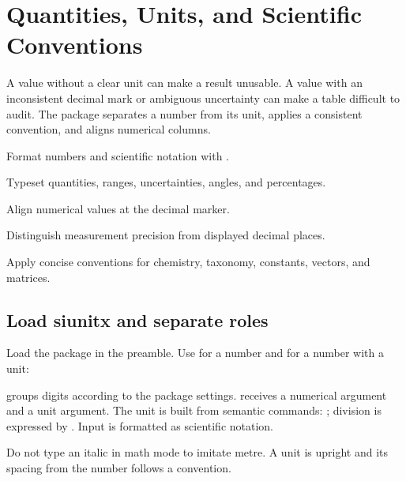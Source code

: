 \chapter{Quantities, Units, and Scientific Conventions}
\label{chap:units}

A value without a clear unit can make a result unusable. A value with an
inconsistent decimal mark or ambiguous uncertainty can make a table difficult
to audit. The  package separates a number from its unit, applies a
consistent convention, and aligns numerical columns.

\begin{learningoutcomes}
  \item Format numbers and scientific notation with .
  \item Typeset quantities, ranges, uncertainties, angles, and percentages.
  \item Align numerical values at the decimal marker.
  \item Distinguish measurement precision from displayed decimal places.
  \item Apply concise conventions for chemistry, taxonomy, constants, vectors,
        and matrices.
\end{learningoutcomes}

\section{Load siunitx and separate roles}

Load the package in the preamble. Use  for a number and  for
a number with a unit:


 groups digits according to the package settings.
 receives a numerical argument and a unit argument. The unit is built
from semantic commands: ; division is expressed by
. Input  is formatted as scientific notation.

Do not type an italic  in math mode to imitate metre. A unit is upright
and its spacing from the number follows a convention.


